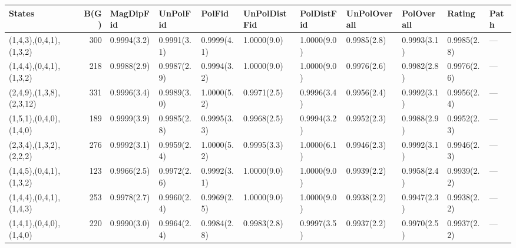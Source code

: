 \begin{tabular}{lrlllllllll}
\hline
 States                   &   B(G) & MagDipFid   & UnPolFid    & PolFid      & UnPolDistFid   & PolDistFid   & UnPolOverall   & PolOverall   & Rating      & Path   \\
\hline
 (1,4,3),(0,4,1),(1,3,2)  &    300 & 0.9994(3.2) & 0.9991(3.1) & 0.9999(4.1) & 1.0000(9.0)    & 1.0000(9.0)  & 0.9985(2.8)    & 0.9993(3.1)  & 0.9985(2.8) & ---    \\
 (1,4,4),(0,4,1),(1,3,2)  &    218 & 0.9988(2.9) & 0.9987(2.9) & 0.9994(3.2) & 1.0000(9.0)    & 1.0000(9.0)  & 0.9976(2.6)    & 0.9982(2.8)  & 0.9976(2.6) & ---    \\
 (2,4,9),(1,3,8),(2,3,12) &    331 & 0.9996(3.4) & 0.9989(3.0) & 1.0000(5.2) & 0.9971(2.5)    & 0.9996(3.4)  & 0.9956(2.4)    & 0.9992(3.1)  & 0.9956(2.4) & ---    \\
 (1,5,1),(0,4,0),(1,4,0)  &    189 & 0.9999(3.9) & 0.9985(2.8) & 0.9995(3.3) & 0.9968(2.5)    & 0.9994(3.2)  & 0.9952(2.3)    & 0.9988(2.9)  & 0.9952(2.3) & ---    \\
 (2,3,4),(1,3,2),(2,2,2)  &    276 & 0.9992(3.1) & 0.9959(2.4) & 1.0000(5.2) & 0.9995(3.3)    & 1.0000(6.1)  & 0.9946(2.3)    & 0.9992(3.1)  & 0.9946(2.3) & ---    \\
 (1,4,5),(0,4,1),(1,3,2)  &    123 & 0.9966(2.5) & 0.9972(2.6) & 0.9992(3.1) & 1.0000(9.0)    & 1.0000(9.0)  & 0.9939(2.2)    & 0.9958(2.4)  & 0.9939(2.2) & ---    \\
 (1,4,4),(0,4,1),(1,4,3)  &    253 & 0.9978(2.7) & 0.9960(2.4) & 0.9969(2.5) & 1.0000(9.0)    & 1.0000(9.0)  & 0.9938(2.2)    & 0.9947(2.3)  & 0.9938(2.2) & ---    \\
 (1,4,1),(0,4,0),(1,4,0)  &    220 & 0.9990(3.0) & 0.9964(2.4) & 0.9984(2.8) & 0.9983(2.8)    & 0.9997(3.5)  & 0.9937(2.2)    & 0.9970(2.5)  & 0.9937(2.2) & ---    \\
\hline
\end{tabular}